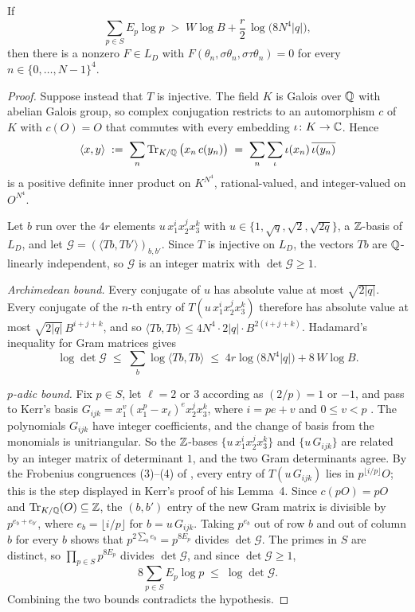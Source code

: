 \begin{proposition}\label{prop:gram}
If
\[
  \sum_{p\in S} E_p \log p \;>\; W \log B + \frac{r}{2}\,\log\!\big(8N^4|q|\big),
\]
then there is a nonzero $F \in L_D$ with $F(\theta_n, \sigma\theta_n, \sigma\tau\theta_n) = 0$ for every $n \in \{0,\dots,N-1\}^4$.
\end{proposition}

\begin{proof}
Suppose instead that $T$ is injective. The field $K$ is Galois over $\mathbb{Q}$ with abelian Galois group, so complex conjugation restricts to an automorphism $c$ of $K$ with $c(O) = O$ that commutes with every embedding $\iota\colon K \to \mathbb{C}$. Hence
\[
  \langle x, y\rangle \;:=\; \sum_{n} \operatorname{Tr}_{K/\mathbb{Q}}\big(x_n\, c(y_n)\big) \;=\; \sum_n \sum_{\iota} \iota(x_n)\,\overline{\iota(y_n)}
\]
is a positive definite inner product on $K^{N^4}$, rational-valued, and integer-valued on $O^{N^4}$.

Let $b$ run over the $4r$ elements $u\, x_1^i x_2^j x_3^k$ with $u \in \{1, \sqrt q, \sqrt 2, \sqrt{2q}\}$, a $\mathbb{Z}$-basis of $L_D$, and let $\mathcal G = (\langle Tb, Tb'\rangle)_{b,b'}$. Since $T$ is injective on $L_D$, the vectors $Tb$ are $\mathbb{Q}$-linearly independent, so $\mathcal G$ is an integer matrix with $\det \mathcal G \ge 1$.

\emph{Archimedean bound.} Every conjugate of $u$ has absolute value at most $\sqrt{2|q|}$. Every conjugate of the $n$-th entry of $T(u\,x_1^ix_2^jx_3^k)$ therefore has absolute value at most $\sqrt{2|q|}\,B^{i+j+k}$, and so $\langle Tb, Tb\rangle \le 4N^4 \cdot 2|q| \cdot B^{2(i+j+k)}$. Hadamard's inequality for Gram matrices gives
\[
  \log \det \mathcal G \;\le\; \sum_b \log\langle Tb, Tb\rangle \;\le\; 4r\log\big(8N^4|q|\big) + 8\,W\log B .
\]

\emph{$p$-adic bound.} Fix $p \in S$, let $\ell = 2$ or $3$ according as $(2/p) = 1$ or $-1$, and pass to Kerr's basis $G_{ijk} = x_1^v(x_1^p - x_\ell)^e x_2^j x_3^k$, where $i = pe + v$ and $0 \le v < p$ \cite[Lemma~2]{Kerr2026}. The polynomials $G_{ijk}$ have integer coefficients, and the change of basis from the monomials is unitriangular. So the $\mathbb{Z}$-bases $\{u\,x_1^ix_2^jx_3^k\}$ and $\{u\,G_{ijk}\}$ are related by an integer matrix of determinant $1$, and the two Gram determinants agree. By the Frobenius congruences (3)--(4) of \cite{Kerr2026}, every entry of $T(u\,G_{ijk})$ lies in $p^{\lfloor i/p\rfloor}O$; this is the step displayed in Kerr's proof of his Lemma~4. Since $c(pO) = pO$ and $\operatorname{Tr}_{K/\mathbb{Q}}(O) \subseteq \mathbb{Z}$, the $(b,b')$ entry of the new Gram matrix is divisible by $p^{e_b + e_{b'}}$, where $e_b = \lfloor i/p\rfloor$ for $b = u\,G_{ijk}$. Taking $p^{e_b}$ out of row $b$ and out of column $b$ for every $b$ shows that $p^{2\sum_b e_b} = p^{8E_p}$ divides $\det \mathcal G$. The primes in $S$ are distinct, so $\prod_{p\in S} p^{8E_p}$ divides $\det \mathcal G$, and since $\det \mathcal G \ge 1$,
\[
  8\sum_{p\in S} E_p\log p \;\le\; \log\det \mathcal G .
\]
Combining the two bounds contradicts the hypothesis.
\end{proof}

